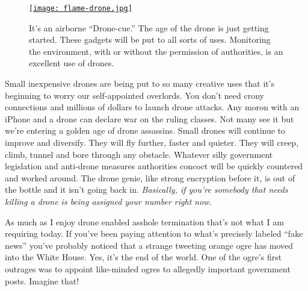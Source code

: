 
\captionsetup[figure]{labelformat=empty}
\begin{SCfigure}
\centering
\href{www.popularmechanics.com/flight/drones/a25282/flame-throwing-drones/}{\texttt{[image: flame-drone.jpg]}}
\caption[It's an airborne ``Drone-cue.'' The drone age is just getting
started]{It's an airborne ``Drone-cue.'' The age of the drone is just getting
started. These gadgets will be put to all sorts of uses. Monitoring the
environment, with or without the permission of authorities, is an
excellent use of drones.}
\label{fig:5375X0}
\end{SCfigure}


Small inexpensive drones are being put to so many creative uses that
it's beginning to worry our self-appointed overlords. You don't need
crony connections and millions of dollars to launch drone attacks. Any
moron with an iPhone and a drone can declare war on the ruling classes.
Not many see it but we're entering a golden age of drone assassins.
Small drones will continue to improve and diversify. They will fly
further, faster and quieter. They will creep, climb, tunnel and bore
through any obstacle. Whatever silly government legislation and
anti-drone measures authorities concoct will be quickly countered and
worked around. The drone genie, like strong encryption before it, is out
of the bottle and it isn't going back in. \emph{Basically, if you're
somebody that needs killing a drone is being assigned your number right
now.}

As much as I enjoy drone enabled asshole termination that's not what I
am requiring today. If you've been paying attention to what's precisely
labeled ``fake news'' you've probably noticed that a strange tweeting
orange ogre has moved into the White House. Yes, it's the end of the
world. One of the ogre's first outrages was to appoint like-minded ogres
to allegedly important government posts. Imagine that!

